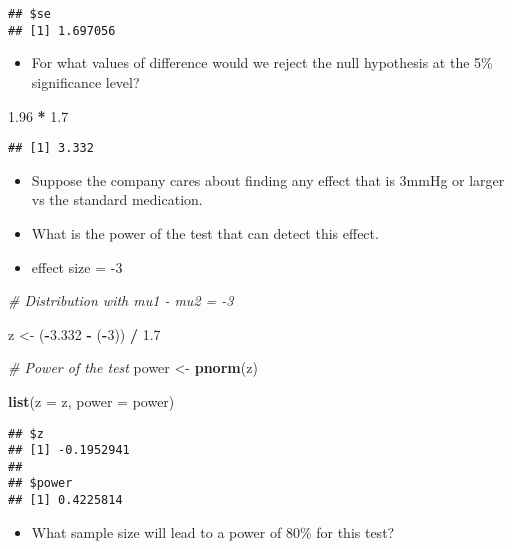 \documentclass[]{book}
\newenvironment{Shaded}{\begin{snugshade}}{\end{snugshade}}
\newcommand{\CommentTok}[1]{\textcolor[rgb]{0.56,0.35,0.01}{\textit{#1}}}
\newcommand{\DataTypeTok}[1]{\textcolor[rgb]{0.13,0.29,0.53}{#1}}
\newcommand{\DecValTok}[1]{\textcolor[rgb]{0.00,0.00,0.81}{#1}}
\newcommand{\FloatTok}[1]{\textcolor[rgb]{0.00,0.00,0.81}{#1}}
\newcommand{\KeywordTok}[1]{\textcolor[rgb]{0.13,0.29,0.53}{\textbf{#1}}}
\newcommand{\NormalTok}[1]{#1}
\newcommand{\OperatorTok}[1]{\textcolor[rgb]{0.81,0.36,0.00}{\textbf{#1}}}
\newcommand{\StringTok}[1]{\textcolor[rgb]{0.31,0.60,0.02}{#1}}
\providecommand{\tightlist}{%
  \setlength{\itemsep}{0pt}\setlength{\parskip}{0pt}}
\begin{document}
\begin{verbatim}
## $se
## [1] 1.697056
\end{verbatim}

\begin{itemize}
\tightlist
\item
  For what values of difference would we reject the null hypothesis at the 5\% significance level?
\end{itemize}

\begin{Shaded}
\begin{Highlighting}[]
\FloatTok{1.96} \OperatorTok{*}\StringTok{ }\FloatTok{1.7}
\end{Highlighting}
\end{Shaded}

\begin{verbatim}
## [1] 3.332
\end{verbatim}

\begin{itemize}
\item
  Suppose the company cares about finding any effect that is 3mmHg or larger vs
  the standard medication.
\item
  What is the power of the test that can detect this effect.
\item
  effect size = -3
\end{itemize}

\begin{Shaded}
\begin{Highlighting}[]
\CommentTok{# Distribution with mu1 - mu2 = -3}

\NormalTok{z <-}\StringTok{ }\NormalTok{(}\OperatorTok{-}\FloatTok{3.332} \OperatorTok{-}\StringTok{ }\NormalTok{(}\OperatorTok{-}\DecValTok{3}\NormalTok{)) }\OperatorTok{/}\StringTok{ }\FloatTok{1.7}

\CommentTok{# Power of the test}
\NormalTok{power <-}\StringTok{ }\KeywordTok{pnorm}\NormalTok{(z)}

\KeywordTok{list}\NormalTok{(}\DataTypeTok{z =}\NormalTok{ z, }\DataTypeTok{power =}\NormalTok{ power)}
\end{Highlighting}
\end{Shaded}

\begin{verbatim}
## $z
## [1] -0.1952941
## 
## $power
## [1] 0.4225814
\end{verbatim}

\begin{itemize}
\tightlist
\item
  What sample size will lead to a power of 80\% for this test?
\end{itemize}
\end{document}
